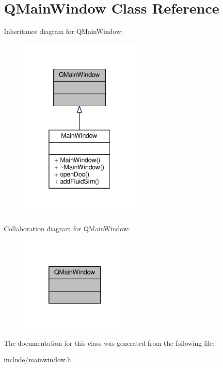 \hypertarget{class_q_main_window}{\section{Q\-Main\-Window Class Reference}
\label{class_q_main_window}
}


Inheritance diagram for Q\-Main\-Window\-:
\nopagebreak
\begin{figure}[H]
\begin{center}
\leavevmode
\includegraphics[width=174pt]{class_q_main_window__inherit__graph}
\end{center}
\end{figure}


Collaboration diagram for Q\-Main\-Window\-:
\nopagebreak
\begin{figure}[H]
\begin{center}
\leavevmode
\includegraphics[width=160pt]{class_q_main_window__coll__graph}
\end{center}
\end{figure}


The documentation for this class was generated from the following file\-:\begin{DoxyCompactItemize}
\item 
include/mainwindow.\-h\end{DoxyCompactItemize}
